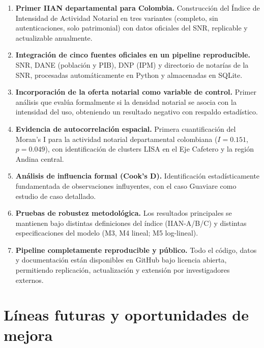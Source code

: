\documentclass{article}
\begin{document}
\begin{enumerate}
    \item \textbf{Primer IIAN departamental para Colombia.}
    Construcción del Índice de Intensidad de Actividad Notarial en
    tres variantes (completo, sin autenticaciones, solo patrimonial)
    con datos oficiales del SNR, replicable y actualizable anualmente.

    \item \textbf{Integración de cinco fuentes oficiales en un
    pipeline reproducible.} SNR, DANE (población y PIB), DNP (IPM)
    y directorio de notarías de la SNR, procesadas automáticamente
    en Python y almacenadas en SQLite.

    \item \textbf{Incorporación de la oferta notarial como variable
    de control.} Primer análisis que evalúa formalmente si la
    densidad notarial se asocia con la intensidad del uso, obteniendo
    un resultado negativo con respaldo estadístico.

    \item \textbf{Evidencia de autocorrelación espacial.}
    Primera cuantificación del Moran's I para la actividad notarial
    departamental colombiana ($I=0.151$, $p=0.049$), con identificación
    de clusters LISA en el Eje Cafetero y la región Andina central.

    \item \textbf{Análisis de influencia formal (Cook's D).}
    Identificación estadísticamente fundamentada de observaciones
    influyentes, con el caso Guaviare como estudio de caso detallado.

    \item \textbf{Pruebas de robustez metodológica.}
    Los resultados principales se mantienen bajo distintas
    definiciones del índice (IIAN-A/B/C) y distintas especificaciones
    del modelo (M3, M4 lineal; M5 log-lineal).

    \item \textbf{Pipeline completamente reproducible y público.}
    Todo el código, datos y documentación están disponibles en
    GitHub bajo licencia abierta, permitiendo replicación,
    actualización y extensión por investigadores externos.
\end{enumerate}

\newpage
\section{Líneas futuras y oportunidades de mejora}
\label{sec:lineas_futuras}
\end{document}
